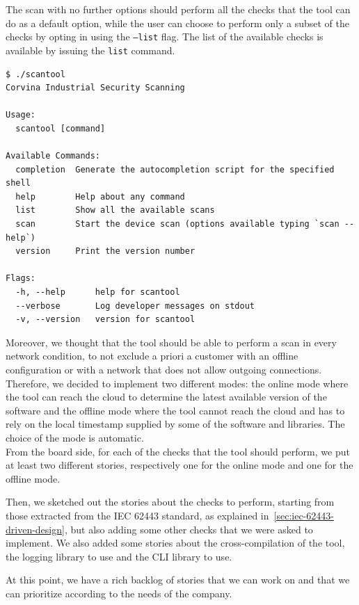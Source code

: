 The scan with no further options should perform all the checks that the tool can do as a default option, while the user can choose to perform only a subset of the checks by opting in using the \texttt{--list} flag. The list of the available checks is available by issuing the \texttt{list} command.

\noindent\begin{minipage}{\linewidth}
  \vspace{0.5cm}
  \begin{lstlisting}[caption={Man page}, numbers=none]
$ ./scantool
Corvina Industrial Security Scanning

Usage:
  scantool [command]

Available Commands:
  completion  Generate the autocompletion script for the specified shell
  help        Help about any command
  list        Show all the available scans
  scan        Start the device scan (options available typing `scan --help`)
  version     Print the version number

Flags:
  -h, --help      help for scantool
  --verbose       Log developer messages on stdout
  -v, --version   version for scantool
\end{lstlisting}
\end{minipage}

Moreover, we thought that the tool should be able to perform a scan in every network condition, to not exclude a priori a customer with an offline configuration or with a network that does not allow outgoing connections. Therefore, we decided to implement two different modes: the online mode where the tool can reach the cloud to determine the latest available version of the software and the offline mode where the tool cannot reach the cloud and has to rely on the local timestamp supplied by some of the software and libraries. The choice of the mode is automatic. \\
From the board side, for each of the checks that the tool should perform, we put at least two different stories, respectively one for the online mode and one for the offline mode.

Then, we sketched out the stories about the checks to perform, starting from those extracted from the IEC 62443 standard, as explained in~\cref{sec:iec-62443-driven-design}, but also adding some other checks that we were asked to implement. We also added some stories about the cross-compilation of the tool, the logging library to use and the CLI library to use.

At this point, we have a rich backlog of stories that we can work on and that we can prioritize according to the needs of the company.

